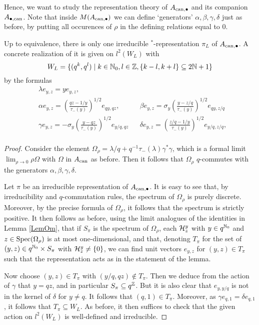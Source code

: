 Hence, we want to study the representation theory of $A_{\operatorname{\mathrm{can}},\bullet}$ and its companion $A_{\bullet,\operatorname{\mathrm{can}}}$. Note that inside $M(A_{\operatorname{\mathrm{can}},\bullet})$ we can define `generators' $\alpha,\beta,\gamma,\delta$ just as before, by putting all occurences of $\rho$ in the defining relations equal to $0$. 

\begin{Lem} Up to equivalence, there is only one irreducible $^*$-representation $\pi_L$ of $A_{\operatorname{\mathrm{can}},\bullet}$. A concrete realization of it is given on $l^2(W_{L})$ with \[W_L= \{(q^k,q^l)\mid k\in \mathbb{N}_0,l\in \mathbb{Z}, \{k-l,k+l\}\subseteq 2\mathbb{N}+1\}\] by the formulas \begin{align*}& \lambda e_{y,z} =ye_{y,z},\\
 &\alpha e_{y,z}  = \left(\frac{qz-1/y}{\tau_-(y)}\right)^{1/2} e_{qy,qz}, && \beta e_{y,z}= \sigma_y \left(\frac{y-z/q}{\tau_-(y)}\right)^{1/2} e_{qy,z/q}\\ &\gamma e_{y,z} = -\sigma_y \left(\frac{y-qz}{\tau_-(y)}\right)^{1/2}e_{y/q,qz} &&\delta e_{y,z} = \left(\frac{z/q-1/y}{\tau_-(y)}\right)^{1/2} e_{y/q,z/q},\\ 
\end{align*}
\end{Lem}

\begin{proof} Consider the element $\Omega_{\rho} = \lambda/q+q^{-1}\tau_-(\lambda)\gamma^*\gamma$, which is a formal limit $\lim_{\rho\rightarrow 0} \rho\Omega$ with $\Omega$ in $A_{\operatorname{\mathrm{can}}}$ as before. Then it follows that $\Omega_{\rho}$ $q$-commutes with the generators $\alpha,\beta,\gamma,\delta$. 

Let $\pi$ be an irreducible representation of $A_{\operatorname{\mathrm{can}},\bullet}$. It is easy to see that, by irreducibility and $q$-commutation rules, the spectrum of $\Omega_{\rho}$ is purely discrete. Moreover, by the precise formula of $\Omega_{\rho}$, it follows that the spectrum is strictly positive. It then follows as before, using the limit analogues of the identities in Lemma \ref{LemOm}, that if $S_{\pi}$ is the spectrum of $\Omega_{\rho}$, each $\mathcal{H}^y_z$ with $y\in q^{\mathbb{N}_0}$ and $z\in \operatorname{\mathrm{Spec}}(\Omega_{\rho})$ is at most one-dimensional, and that, denoting $T_{\pi}$ for the set of $(y,z)\in q^{\mathbb{N}_0}\times S_{\pi}$ with $\mathcal{H}^y_z\neq \{0\}$, we can find unit vectors $e_{y,z}$ for $(y,z)\in T_{\pi}$ such that the representation acts as in the statement of the lemma.  

Now choose $(y,z)\in T_{\pi}$ with $(y/q,qz)\notin T_{\pi}$. Then we deduce from the action of $\gamma$ that $y=qz$, and in particular $S_{\pi} \subseteq q^{\mathbb{Z}}$. But it is also clear that $e_{y,y/q}$ is not in the kernel of $\delta$ for $y\neq q$. It follows that $(q,1) \in T_{\pi}$. Moreover, as $\gamma e_{q,1} = \delta e_{q,1}$, it follows that $T_{\pi}\subseteq W_L$. As before, it then suffices to check that the given action on $l^2(W_L)$ is well-defined and irreducible.

\end{proof}

